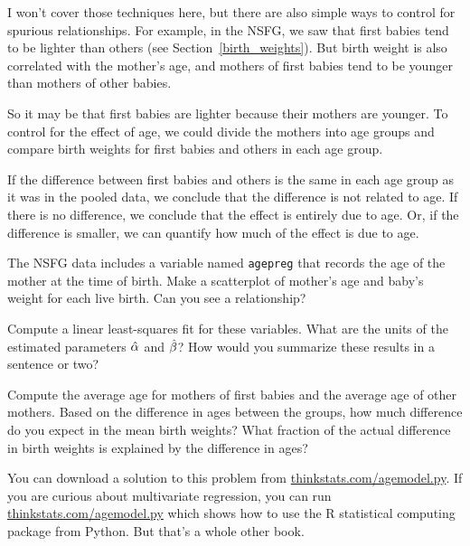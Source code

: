 \documentclass[12pt]{book}
\begin{document}
I won't cover those techniques here, but there are also simple ways to
control for spurious relationships.  For example, in the NSFG, we saw
that first babies tend to be lighter than others (see
Section~\ref{birth_weights}).  But birth weight is also correlated
with the mother's age, and mothers of first babies tend to be younger
than mothers of other babies.

So it may be that first babies are lighter because their mothers are
younger.  To control for the effect of age, we could divide the mothers
into age groups and compare birth weights for first babies and others
in each age group.

If the difference between first babies and others is the same in
each age group as it was in the pooled data, we conclude
that the difference is not related to age.  If there is no difference,
we conclude that the effect is entirely due to age.  Or,
if the difference is smaller, we can quantify how much of the effect
is due to age.

\begin{ex}

The NSFG data includes a variable named {\tt agepreg} that records
the age of the mother at the time of birth.
Make a scatterplot of mother's age and baby's weight for each live
birth.  Can you see a relationship?

Compute a linear least-squares fit for these variables.  What are the
units of the estimated parameters $\hat{\alpha}$ and $\hat{\beta}$?
How would you summarize these results in a sentence or two?

Compute the average age for mothers of first babies and the average
age of other mothers.  Based on the difference in ages between the
groups, how much difference do you expect in the mean birth weights?
What fraction of the actual difference in birth weights is explained
by the difference in ages?

You can download a solution to this problem from
\url{thinkstats.com/agemodel.py}.  If you are curious about
multivariate regression, you can run \url{thinkstats.com/agemodel.py}
which shows how to use the R statistical computing package from
Python.  But that's a whole other book.

\end{ex}

\end{document}
